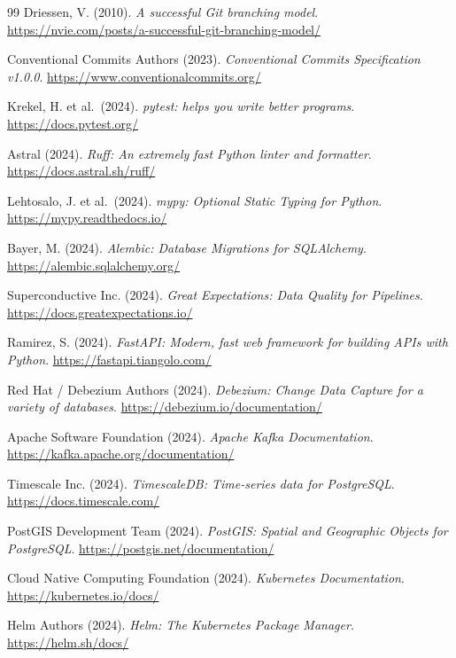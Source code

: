 ﻿\documentclass[12pt,a4paper]{report}
\theoremstyle{definition}
\theoremstyle{remark}
\begin{document}
\begin{thebibliography}{99}
  Driessen, V. (2010).
  \textit{A successful Git branching model}.
  \url{https://nvie.com/posts/a-successful-git-branching-model/}

  Conventional Commits Authors (2023).
  \textit{Conventional Commits Specification v1.0.0}.
  \url{https://www.conventionalcommits.org/}

  Krekel, H. et al.\ (2024).
  \textit{pytest: helps you write better programs}.
  \url{https://docs.pytest.org/}

  Astral (2024).
  \textit{Ruff: An extremely fast Python linter and formatter}.
  \url{https://docs.astral.sh/ruff/}

  Lehtosalo, J. et al.\ (2024).
  \textit{mypy: Optional Static Typing for Python}.
  \url{https://mypy.readthedocs.io/}

  Bayer, M. (2024).
  \textit{Alembic: Database Migrations for SQLAlchemy}.
  \url{https://alembic.sqlalchemy.org/}

  Superconductive Inc. (2024).
  \textit{Great Expectations: Data Quality for Pipelines}.
  \url{https://docs.greatexpectations.io/}

  Ramirez, S. (2024).
  \textit{FastAPI: Modern, fast web framework for building APIs with Python}.
  \url{https://fastapi.tiangolo.com/}

  Red Hat / Debezium Authors (2024).
  \textit{Debezium: Change Data Capture for a variety of databases}.
  \url{https://debezium.io/documentation/}

  Apache Software Foundation (2024).
  \textit{Apache Kafka Documentation}.
  \url{https://kafka.apache.org/documentation/}

  Timescale Inc. (2024).
  \textit{TimescaleDB: Time-series data for PostgreSQL}.
  \url{https://docs.timescale.com/}

  PostGIS Development Team (2024).
  \textit{PostGIS: Spatial and Geographic Objects for PostgreSQL}.
  \url{https://postgis.net/documentation/}

  Cloud Native Computing Foundation (2024).
  \textit{Kubernetes Documentation}.
  \url{https://kubernetes.io/docs/}

  Helm Authors (2024).
  \textit{Helm: The Kubernetes Package Manager}.
  \url{https://helm.sh/docs/}


\end{thebibliography}
\end{document}
